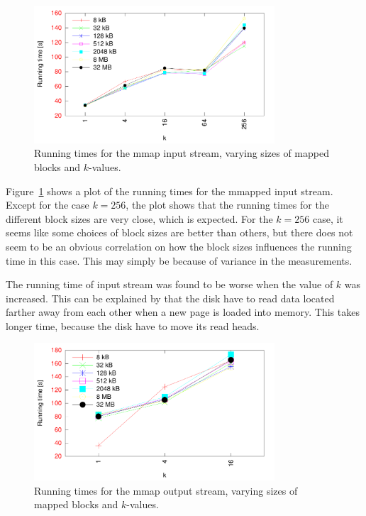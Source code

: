\documentclass[a4paper,12pt]{article}
\begin{document}
\begin{figure}[h!]
  \centering
  \includegraphics[width=0.8\textwidth]{mmap_input}
  \caption{Running times for the mmap input stream, varying sizes of
    mapped blocks and $k$-values.}
  \label{fig:mmap-input}
\end{figure}

Figure~\ref{fig:mmap-input} shows a plot of the running times for the
mmapped input stream. Except for the case $k = 256$, the plot shows
that the running times for the different block sizes are very close,
which is expected. For the $k = 256$ case, it seems like some choices
of block sizes are better than others, but there does not seem to be an
obvious correlation on how the block sizes influences the running time
in this case. This may simply be because of variance in the
measurements.

The running time of input stream was found to be worse when the value
of $k$ was increased. This can be explained by that the disk have to
read data located farther away from each other when a new page is
loaded into memory. This takes longer time, because the disk have to
move its read heads.

\begin{figure}[h!]
  \centering
  \includegraphics[width=0.8\textwidth]{mmap_output}
  \caption{Running times for the mmap output stream, varying sizes of
    mapped blocks and $k$-values.}
  \label{fig:mmap-output}
\end{figure}
\end{document}
